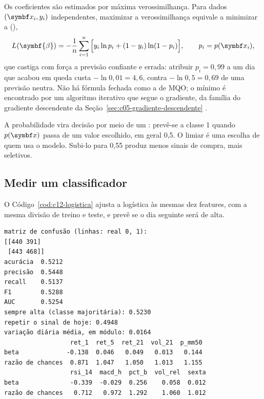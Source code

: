 Os coeficientes são estimados por máxima verossimilhança. Para dados $(\vetor{x}_i, y_i)$ independentes, maximizar a verossimilhança equivale a minimizar a  (),
\begin{equation}
  L(\symbf{\beta}) = -\frac{1}{n} \sum_{i=1}^{n} \Big[ y_i \ln p_i + (1 - y_i) \ln (1 - p_i) \Big] , \qquad p_i = p(\vetor{x}_i) ,
  \label{eq:c12-logloss}
\end{equation}
que castiga com força a previsão confiante e errada: atribuir $p_i = 0,99$ a um dia que acabou em queda custa $-\ln 0,01 = 4,6$, contra $-\ln 0,5 = 0,69$ de uma previsão neutra. Não há fórmula fechada como a de MQO; o mínimo é encontrado por um algoritmo iterativo que segue o gradiente, da família do gradiente descendente da Seção~\ref{sec:c05-gradiente-descendente} \citep[seção 4.4]{hastie2009}.

A probabilidade vira decisão por meio de um : prevê-se a classe 1 quando $p(\vetor{x})$ passa de um valor escolhido, em geral 0,5. O limiar é uma escolha de quem usa o modelo. Subi-lo para 0,55 produz menos sinais de compra, mais seletivos.

\subsection{Medir um classificador}

O Código~\ref{cod:c12-logistica} ajusta a logística às mesmas dez features, com a mesma divisão de treino e teste, e prevê se o dia seguinte será de alta.


\begin{lstlisting}[style=saida]
matriz de confusão (linhas: real 0, 1):
[[440 391]
 [443 468]]
acurácia  0.5212
precisão  0.5448
recall    0.5137
F1        0.5288
AUC       0.5254
sempre alta (classe majoritária): 0.5230
repetir o sinal de hoje: 0.4948
variação diária média, em módulo: 0.0164
                  ret_1  ret_5  ret_21  vol_21  p_mm50
beta             -0.138  0.046   0.049   0.013   0.144
razão de chances  0.871  1.047   1.050   1.013   1.155
                  rsi_14  macd_h  pct_b  vol_rel  sexta
beta              -0.339  -0.029  0.256    0.058  0.012
razão de chances   0.712   0.972  1.292    1.060  1.012
\end{lstlisting}

